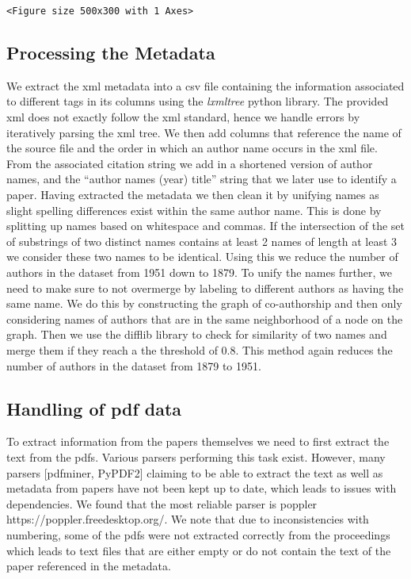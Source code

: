 \documentclass[journal,twocolumn]{IEEEtran}
\begin{document}
    
    \begin{verbatim}
<Figure size 500x300 with 1 Axes>
    \end{verbatim}

    
    \hypertarget{processing-the-metadata}{%
\subsection{Processing the Metadata}\label{processing-the-metadata}}

We extract the xml metadata into a csv file containing the information
associated to different tags in its columns using the \emph{lxmltree}
python library. The provided xml does not exactly follow the xml
standard, hence we handle errors by iteratively parsing the xml tree. We
then add columns that reference the name of the source file and the
order in which an author name occurs in the xml file. From the
associated citation string we add in a shortened version of author
names, and the ``author names (year) title'' string that we later use to
identify a paper. Having extracted the metadata we then clean it by
unifying names as slight spelling differences exist within the same
author name. This is done by splitting up names based on whitespace and
commas. If the intersection of the set of substrings of two distinct
names contains at least 2 names of length at least 3 we consider these
two names to be identical. Using this we reduce the number of authors in
the dataset from 1951 down to 1879. To unify the names further, we need
to make sure to not overmerge by labeling to different authors as having
the same name. We do this by constructing the graph of co-authorship and
then only considering names of authors that are in the same neighborhood
of a node on the graph. Then we use the difflib library to check for
similarity of two names and merge them if they reach a the threshold of
0.8. This method again reduces the number of authors in the dataset from
1879 to 1951.

    \hypertarget{handling-of-pdf-data}{%
\subsection{Handling of pdf data}\label{handling-of-pdf-data}}

To extract information from the papers themselves we need to first
extract the text from the pdfs. Various parsers performing this task
exist. However, many parsers {[}pdfminer, PyPDF2{]} claiming to be able
to extract the text as well as metadata from papers have not been kept
up to date, which leads to issues with dependencies. We found that the
most reliable parser is poppler https://poppler.freedesktop.org/. We
note that due to inconsistencies with numbering, some of the pdfs were
not extracted correctly from the proceedings which leads to text files
that are either empty or do not contain the text of the paper referenced
in the metadata.
\end{document}
